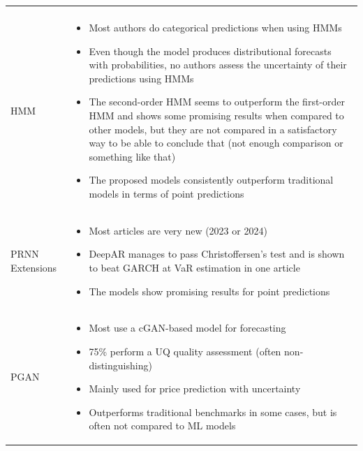 \begin{table}[ht!]
\begin{adjustbox}{width=1\textwidth,center}
\begin{tabular}{p{}p{}}
\begin{itemize}[left=0pt]
        \end{itemize}\\
        \addlinespace
        \hdashline[0.2pt/3pt]
        \addlinespace
        HMM & 
        \begin{itemize}[left=0pt]
        \vspace{-4mm}
            \item Most authors do categorical predictions when using HMMs
            \item Even though the model produces distributional forecasts with probabilities, no authors assess the uncertainty of their predictions using HMMs
            \item The second-order HMM seems to outperform the first-order HMM and shows some promising results when compared to other models, but they are not compared in a satisfactory way to be able to conclude that (not enough comparison or something like that)
            \item The proposed models consistently outperform traditional models in terms of point predictions
        \end{itemize}\\

        \addlinespace
        \hdashline[0.2pt/3pt]
        \addlinespace
        PRNN Extensions & 
        \begin{itemize}[left=0pt]
        \vspace{-4mm}
            \item Most articles are very new (2023 or 2024)
            \item DeepAR manages to pass Christoffersen's test and is shown to beat GARCH at VaR estimation in one article
            \item The models show promising results for point predictions
        \end{itemize}\\
        \addlinespace
        \hdashline[0.2pt/3pt]
        \addlinespace
        PGAN & 
        \begin{itemize}[left=0pt]
        \vspace{-4mm}
            \item Most use a cGAN-based model for forecasting
            \item 75\% perform a UQ quality assessment (often non-distinguishing)
            \item Mainly used for price prediction with uncertainty
            \item Outperforms traditional benchmarks in some cases, but is often not compared to ML models
        \end{itemize}\\


\end{tabular}
\end{adjustbox}
\end{table}
